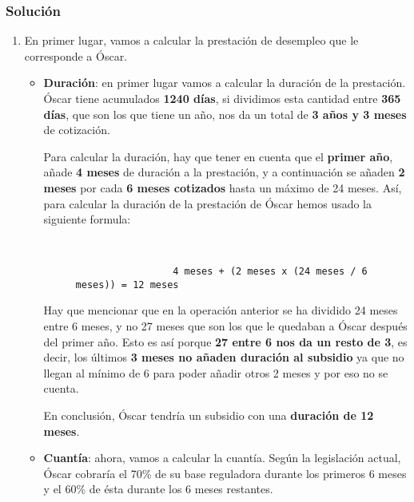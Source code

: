 \subsubsection{Solución}
\begin{enumerate}[label=\alph*)]
    \item En primer lugar, vamos a calcular la prestación de desempleo que le corresponde a Óscar.
    \begin{itemize}
        \item \textbf{Duración}: en primer lugar vamos a calcular la duración de la prestación. Óscar tiene acumulados \textbf{1240 días}, si dividimos esta cantidad entre \textbf{365 días}, que son los que tiene un año, nos da un total de \textbf{3 años y 3 meses} de cotización.

        Para calcular la duración, hay que tener en cuenta que el \textbf{primer año}, añade \textbf{4 meses} de duración a la prestación, y a continuación se añaden \textbf{2 meses} por cada \textbf{6 meses cotizados} hasta un máximo de 24 meses. Así, para calcular la duración de la prestación de Óscar hemos usado la siguiente formula:

        \begin{figure}[h]
            \begin{tcolorbox}[sharp corners, colback=yellow!30, colframe=white!20]
                \scriptsize
                \begin{verbatim}


                 4 meses + (2 meses x (24 meses / 6 meses)) = 12 meses
                \end{verbatim}
            \end{tcolorbox}
        \end{figure}

         Hay que mencionar que en la operación anterior se ha dividido 24 meses entre 6 meses, y no 27 meses que son los que le quedaban a Óscar después del primer año. Esto es así porque \textbf{27 entre 6 nos da un resto de 3}, es decir, los últimos \textbf{3 meses no añaden duración al subsidio} ya que no llegan al mínimo de 6 para poder añadir otros 2 meses y por eso no se cuenta.

         En conclusión, Óscar tendría un subsidio con una \textbf{duración de 12 meses}.

         \item \textbf{Cuantía}: ahora, vamos a calcular la cuantía. Según la legislación actual, Óscar cobraría el 70\% de su base reguladora durante los primeros 6 meses y el 60\% de ésta durante los 6 meses restantes.



\end{itemize}
\end{enumerate}
